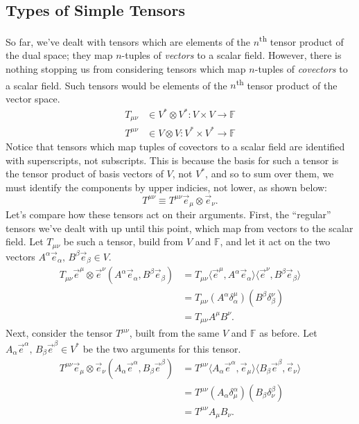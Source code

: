 \subsection{Types of Simple Tensors}
So far, we've dealt with tensors which are elements of the $n$\textsuperscript{th} tensor product of the dual space; they map $n$-tuples of \emph{vectors} to a scalar field.
However, there is nothing stopping us from considering tensors which map $n$-tuples of \emph{covectors} to a scalar field.
Such tensors would be elements of the $n$\textsuperscript{th} tensor product of the vector space.
\begin{align*}
    T_{\mu\nu} &\in V^* \otimes V^* : V \times V \to \mathbb{F} \tag{vectors $\to$ scalar field} \\
    T^{\mu\nu} &\in V \otimes V : V^* \times V^* \to \mathbb{F} \tag{covectors $\to$ scalar field}
\end{align*}
Notice that tensors which map tuples of covectors to a scalar field are identified with superscripts, not subscripts.
This is because the basis for such a tensor is the tensor product of basis vectors of $V$, not $V^*$, and so to sum over them, we must identify the components by upper indicies, not lower, as shown below:
\[ T^{\mu\nu} \equiv T^{\mu\nu} \vec{e}_\mu \otimes \vec{e}_\nu. \]
Let's compare how these tensors act on their arguments. First, the ``regular'' tensors we've dealt with up until this point, which map from vectors to the scalar field. Let $T_{\mu\nu}$ be such a tensor, build from $V$ and $\mathbb{F}$, and let it act on the two vectors $A^\alpha \vec{e}_\alpha,\,B^\beta \vec{e}_\beta \in V$.
\begin{align*}
    T_{\mu\nu} \vec{e}^\mu \otimes \vec{e}^\nu \left( A^\alpha \vec{e}_\alpha, B^\beta \vec{e}_\beta \right) &= T_{\mu\nu} \langle \vec{e}^\mu, A^\alpha \vec{e}_\alpha \rangle \langle \vec{e}^\nu, B^\beta \vec{e}_\beta \rangle \\
    &= T_{\mu\nu} \left( A^\alpha \delta^\mu_\alpha \right) \left( B^\beta \delta^\nu_\beta \right) \\
    &= T_{\mu\nu}A^\mu B^\nu.
\end{align*}
Next, consider the tensor $T^{\mu\nu}$, built from the same $V$ and $\mathbb{F}$ as before. Let $A_\alpha \vec{e}^\alpha,\,B_\beta \vec{e}^\beta \in V^*$ be the two arguments for this tensor. 
\begin{align*}
    T^{\mu\nu} \vec{e}_\mu \otimes \vec{e}_\nu \left(A_\alpha \vec{e}^\alpha,B_\beta \vec{e}^\beta\right) &= T^{\mu\nu} \langle A_\alpha \vec{e}^\alpha, \vec{e}_\mu \rangle \langle B_\beta \vec{e}^\beta, \vec{e}_\nu \rangle \\
    &= T^{\mu\nu} \left(A_\alpha \delta^\alpha_\mu\right) \left(B_\beta \delta^\beta_\nu\right) \\
    &= T^{\mu\nu}A_\mu B_\nu.
\end{align*}

